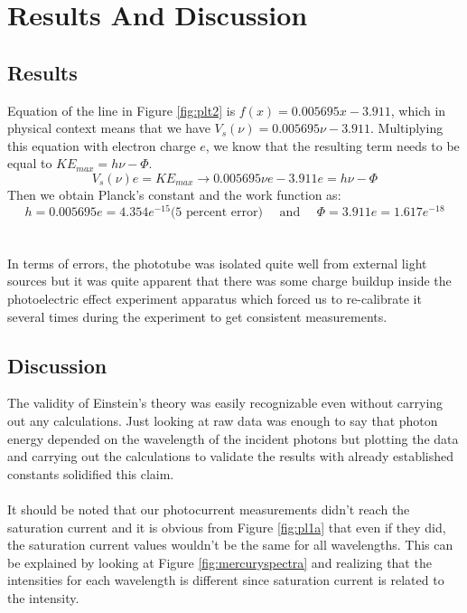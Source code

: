 \section{Results And Discussion}

	\subsection{Results}
	Equation of the line in Figure \ref{fig:plt2} is $f(x) = 0.005695 x - 3.911$, which in physical context means that we have $V_s(\nu) = 0.005695 \nu - 3.911$. Multiplying this equation with electron charge $e$, we know that the resulting term needs to be equal to $KE_{max} = h \nu - \Phi$. 
	\begin{equation}
		V_s(\nu) e = KE_{max} \rightarrow 0.005695 \nu e - 3.911 e = h \nu - \Phi
	\end{equation}
	Then we obtain Planck's constant and the work function as:
	\begin{equation}
		h = 0.005695e = 4.354e^{-15} \text{(5 percent error)} \quad \text{ and } \quad \Phi = 3.911e = 1.617e^{-18}
	\end{equation}
	\\
	\\
	In terms of errors, the phototube was isolated quite well from external light sources but it was quite apparent that there was some charge buildup inside the photoelectric effect experiment apparatus which forced us to re-calibrate it several times during the experiment to get consistent measurements.
	
	\subsection{Discussion}
	The validity of Einstein's theory was easily recognizable even without carrying out any calculations. Just looking at raw data was enough to say that photon energy depended on the wavelength of the incident photons but plotting the data and carrying out the calculations to validate the results with already established constants solidified this claim.
	\\
	\\
	It should be noted that our photocurrent measurements didn't reach the saturation current and it is obvious from Figure \ref{fig:pl1a} that even if they did, the saturation current values wouldn't be the same for all wavelengths. This can be explained by looking at Figure \ref{fig:mercuryspectra} and realizing that the intensities for each wavelength is different since saturation current is related to the intensity. 